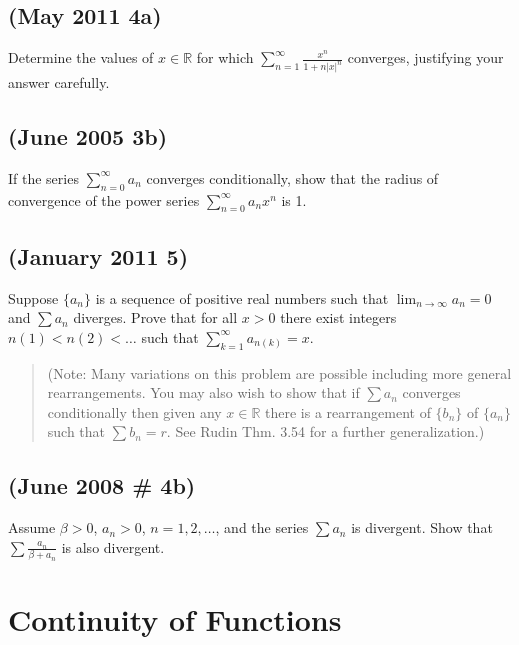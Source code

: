 \hypertarget{may-2011-4a}{%
\subsection{(May 2011 4a)}\label{may-2011-4a}}

Determine the values of \(x\in\mathbb{R}\) for which
\(\displaystyle\sum_{n=1}^\infty \frac{x^n}{1+n|x|^n}\) converges,
justifying your answer carefully.

\hypertarget{june-2005-3b}{%
\subsection{(June 2005 3b)}\label{june-2005-3b}}

If the series \(\sum_{n=0}^\infty a_n\) converges conditionally, show
that the radius of convergence of the power series
\(\sum_{n=0}^\infty a_nx^n\) is 1.

\hypertarget{january-2011-5}{%
\subsection{(January 2011 5)}\label{january-2011-5}}

Suppose \(\{a_n\}\) is a sequence of positive real numbers such that
\(\lim_{n\to\infty}a_n=0\) and \(\sum a_n\) diverges. Prove that for all
\(x>0\) there exist integers \(n(1)<n(2)<\ldots\) such that
\(\sum_{k=1}^\infty a_{n(k)}=x\).\\

\begin{quote}
(Note: Many variations on this problem are possible including more
general rearrangements. You may also wish to show that if \(\sum a_n\)
converges conditionally then given any \(x\in\mathbb{R}\) there is a
rearrangement of \(\{b_n\}\) of \(\{a_n\}\) such that \(\sum b_n=r\).
See Rudin Thm. 3.54 for a further generalization.)
\end{quote}

\hypertarget{june-2008-4b}{%
\subsection{(June 2008 \# 4b)}\label{june-2008-4b}}

Assume \(\beta >0\), \(a_n>0\), \(n=1,2,\ldots\), and the series
\(\sum a_n\) is divergent. Show that
\(\displaystyle \sum \frac{a_n}{\beta + a_n}\) is also divergent.

\hypertarget{continuity-of-functions}{%
\section{Continuity of Functions}\label{continuity-of-functions}}

